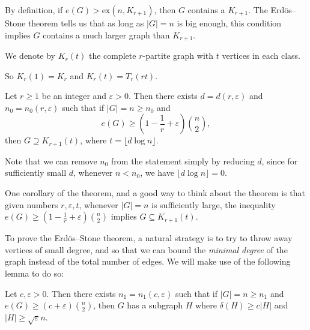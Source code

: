 \documentclass[a4paper]{article}
\renewcommand\ex{\mathrm{ex}}
\begin{document}
By definition, if $e(G) > \ex(n, K_{r + 1})$, then $G$ contains a $K_{r + 1}$. The Erd\"os--Stone theorem tells us that as long as $|G| = n$ is big enough, this condition implies $G$ contains a much larger graph than $K_{r + 1}$.

\begin{notation}
  We denote by $K_r(t)$ the complete $r$-partite graph with $t$ vertices in each class.
\end{notation}
So $K_r(1) = K_r$ and $K_r(t) = T_r(rt)$.

\begin{thm}
  Let $r \geq 1$ be an integer and $\varepsilon > 0$. Then there exists $d = d(r, \varepsilon)$ and $n_0 = n_0(r, \varepsilon)$ such that if $|G| = n \geq n_0$ and
  \[
    e(G) \geq \left(1 - \frac{1}{r} + \varepsilon \right) \binom{n}{2},
  \]
  then $G \supseteq K_{r + 1}(t)$, where $t = \lfloor d \log n\rfloor$.
\end{thm}
Note that we can remove $n_0$ from the statement simply by reducing $d$, since for sufficiently small $d$, whenever $n < n_0$, we have $\lfloor d \log n\rfloor = 0$.

One corollary of the theorem, and a good way to think about the theorem is that given numbers $r, \varepsilon, t$, whenever $|G| = n$ is sufficiently large, the inequality $e(G) \geq \left(1 - \frac{1}{r} + \varepsilon\right) \binom{n}{2}$ implies $G \subseteq K_{r + 1}(t)$.

To prove the Erd\"os--Stone theorem, a natural strategy is to try to throw away vertices of small degree, and so that we can bound the \emph{minimal degree} of the graph instead of the total number of edges. We will make use of the following lemma to do so:
\begin{lemma}
  Let $c, \varepsilon > 0$. Then there exists $n_1 = n_1(c, \varepsilon)$ such that if $|G| = n \geq n_1$ and $e(G) \geq (c + \varepsilon) \binom{n}{2}$, then $G$ has a subgraph $H$ where $\delta(H) \geq c |H|$ and $|H| \geq \sqrt{\varepsilon} n$.
\end{lemma}
\end{document}
